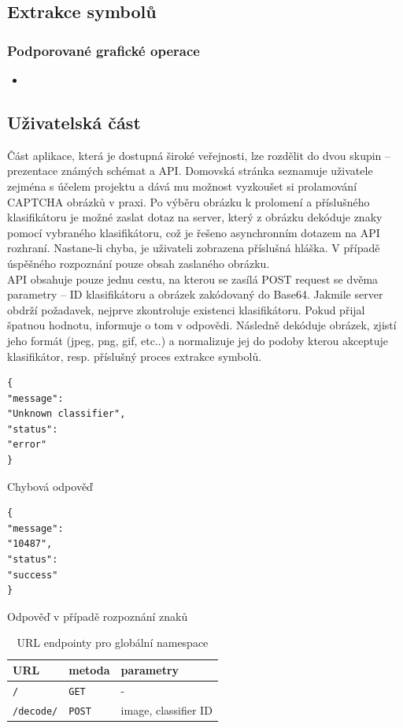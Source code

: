 \documentclass[
  master=true,
  biblatex,
  glossaries,
  index
]{kidiplom}
\begin{document}
\subsection{Extrakce symbolů}
\subsubsection{Podporované grafické operace}
\begin{itemize}
\item 
\end{itemize}
\subsection{Uživatelská část}
Část aplikace, která je dostupná široké veřejnosti, lze rozdělit do dvou skupin -- prezentace známých schémat a API. Domovská stránka seznamuje uživatele zejména s účelem projektu a dává mu možnost vyzkoušet si prolamování CAPTCHA obrázků v praxi. Po výběru obrázku k prolomení a příslušného klasifikátoru je možné zaslat dotaz na server, který z obrázku dekóduje znaky pomocí vybraného klasifikátoru, což je řešeno asynchronním dotazem na API rozhraní. Nastane-li chyba, je uživateli zobrazena příslušná hláška. V případě úspěšného rozpoznání pouze obsah zaslaného obrázku.\\

API obsahuje pouze jednu cestu, na kterou se zasílá POST request se dvěma parametry -- ID klasifikátoru a obrázek zakódovaný do Base64. Jakmile server obdrží požadavek, nejprve zkontroluje existenci klasifikátoru. Pokud přijal špatnou hodnotu, informuje o tom v odpovědi. Následně dekóduje obrázek, zjistí jeho formát (jpeg, png, gif, etc..) a normalizuje jej do podoby kterou akceptuje klasifikátor, resp. příslušný proces extrakce symbolů.

\begin{minipage}{0.45\textwidth}
\begin{verbatim}
{
"message":
"Unknown classifier",
"status":
"error"
}
\end{verbatim}
Chybová odpověď
\end{minipage}
\hfill
\begin{minipage}{0.45\textwidth}
\begin{verbatim}
{
"message":
"10487",
"status":
"success"
}
\end{verbatim}
Odpověď v případě rozpoznání znaků
\end{minipage}

\begin{table}
\begin{tabular}{|l|l|l|}
\hline
\textbf{URL} & \textbf{metoda} & \textbf{parametry}
\\ \hline
\texttt{/} & \texttt{GET} & -
\\ \hline
\texttt{/decode/} & \texttt{POST} & image, classifier ID
\\ \hline
\end{tabular}
\caption{URL endpointy pro globální namespace}
\end{table}
\end{document}
